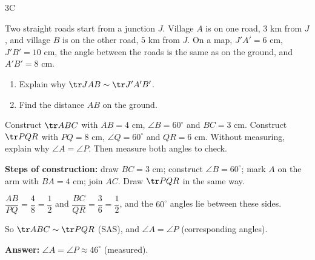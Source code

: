 \begin{exercise}{3C}
\item Two straight roads start from a junction $J$. Village $A$ is on one road, $3$ km from $J$, and village $B$ is on the other road, $5$ km from $J$. On a map, $J'A'=6$ cm, $J'B'=10$ cm, the angle between the roads is the same as on the ground, and $A'B'=8$ cm.
\begin{enumerate}[label=(\alph*),itemsep=1pt]
  \item Explain why $\tr JAB\sim\tr J'A'B'$.
  \item Find the distance $AB$ on the ground.
\end{enumerate}
\begin{solution}
\end{solution}

\item Construct $\tr ABC$ with $AB=4$ cm, $\angle B=60^\circ$ and $BC=3$ cm. Construct $\tr PQR$ with $PQ=8$ cm, $\angle Q=60^\circ$ and $QR=6$ cm. Without measuring, explain why $\angle A=\angle P$. Then measure both angles to check.
\begin{solution}
\textbf{Steps of construction:} draw $BC=3$ cm; construct $\angle B=60^\circ$; mark $A$ on the arm with $BA=4$ cm; join $AC$. Draw $\tr PQR$ in the same way.
\begin{steps}
  \item $\dfrac{AB}{PQ}=\dfrac48=\dfrac12$ and $\dfrac{BC}{QR}=\dfrac36=\dfrac12$, and the $60^\circ$ angles lie between these sides.
  \item So $\tr ABC\sim\tr PQR$ (SAS), and $\angle A=\angle P$ (corresponding angles).
\end{steps}
\textbf{Answer:} $\angle A=\angle P\approx46^\circ$ (measured).
\end{solution}


\end{exercise}
